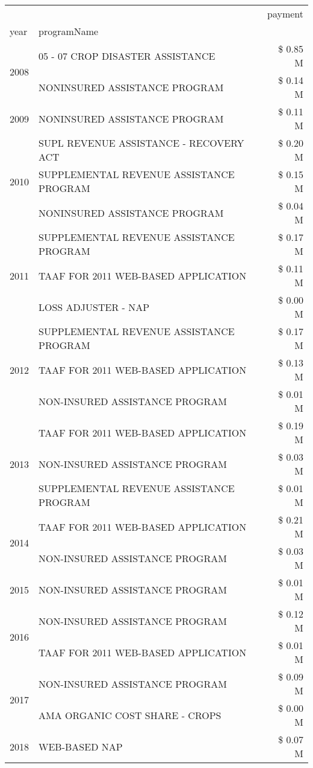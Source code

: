 \begin{tabular}{llr}
\toprule
 &  & payment \\
year & programName &  \\
\midrule
\multirow[t]{2}{*}{2008} & 05 - 07 CROP DISASTER ASSISTANCE & \$ 0.85 M \\
 & NONINSURED ASSISTANCE PROGRAM & \$ 0.14 M \\
\cline{1-3}
2009 & NONINSURED ASSISTANCE PROGRAM & \$ 0.11 M \\
\cline{1-3}
\multirow[t]{3}{*}{2010} & SUPL REVENUE ASSISTANCE - RECOVERY ACT & \$ 0.20 M \\
 & SUPPLEMENTAL REVENUE ASSISTANCE PROGRAM & \$ 0.15 M \\
 & NONINSURED ASSISTANCE PROGRAM & \$ 0.04 M \\
\cline{1-3}
\multirow[t]{3}{*}{2011} & SUPPLEMENTAL REVENUE ASSISTANCE PROGRAM & \$ 0.17 M \\
 & TAAF FOR 2011 WEB-BASED APPLICATION & \$ 0.11 M \\
 & LOSS ADJUSTER - NAP & \$ 0.00 M \\
\cline{1-3}
\multirow[t]{3}{*}{2012} & SUPPLEMENTAL REVENUE ASSISTANCE PROGRAM & \$ 0.17 M \\
 & TAAF FOR 2011 WEB-BASED APPLICATION & \$ 0.13 M \\
 & NON-INSURED ASSISTANCE PROGRAM & \$ 0.01 M \\
\cline{1-3}
\multirow[t]{3}{*}{2013} & TAAF FOR 2011 WEB-BASED APPLICATION & \$ 0.19 M \\
 & NON-INSURED ASSISTANCE PROGRAM & \$ 0.03 M \\
 & SUPPLEMENTAL REVENUE ASSISTANCE PROGRAM & \$ 0.01 M \\
\cline{1-3}
\multirow[t]{2}{*}{2014} & TAAF FOR 2011 WEB-BASED APPLICATION & \$ 0.21 M \\
 & NON-INSURED ASSISTANCE PROGRAM & \$ 0.03 M \\
\cline{1-3}
2015 & NON-INSURED ASSISTANCE PROGRAM & \$ 0.01 M \\
\cline{1-3}
\multirow[t]{2}{*}{2016} & NON-INSURED ASSISTANCE PROGRAM & \$ 0.12 M \\
 & TAAF FOR 2011 WEB-BASED APPLICATION & \$ 0.01 M \\
\cline{1-3}
\multirow[t]{2}{*}{2017} & NON-INSURED ASSISTANCE PROGRAM & \$ 0.09 M \\
 & AMA ORGANIC COST SHARE - CROPS & \$ 0.00 M \\
\cline{1-3}
2018 & WEB-BASED NAP & \$ 0.07 M \\

\end{tabular}
